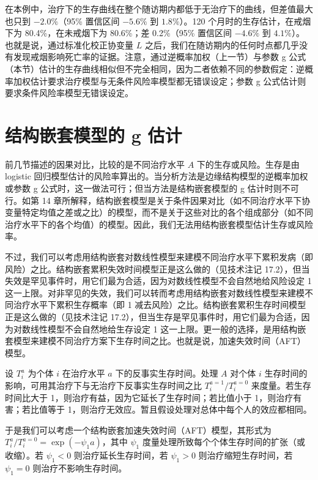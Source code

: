 在本例中，治疗下的生存曲线在整个随访期内都低于无治疗下的曲线，但差值最大也只到 $-2.0\%$（95\% 置信区间 $-5.6\%$ 到 $1.8\%$）。120 个月时的生存估计，在戒烟下为 80.4\%，在未戒烟下为 80.6\%；差 0.2\%（95\% 置信区间 $-4.6\%$ 到 $4.1\%$）。也就是说，通过标准化校正协变量 $L$ 之后，我们在随访期内的任何时点都几乎没有发现戒烟影响死亡率的证据。注意，通过逆概率加权（上一节）与参数 g 公式（本节）估计的生存曲线相似但不完全相同，因为二者依赖不同的参数假定：逆概率加权估计要求治疗模型与无条件风险率模型都无错误设定；参数 g 公式估计则要求条件风险率模型无错误设定。

\section{结构嵌套模型的 g 估计}

前几节描述的因果对比，比较的是不同治疗水平 $A$ 下的生存或风险。生存是由 logistic 回归模型估计的风险率算出的。当分析方法是边缘结构模型的逆概率加权或参数 g 公式时，这一做法可行；但当方法是结构嵌套模型的 g 估计时则不可行。如第 14 章所解释，结构嵌套模型是关于条件因果对比（如不同治疗水平下协变量特定均值之差或之比）的模型，而不是关于这些对比的各个组成部分（如不同治疗水平下的各个均值）的模型。因此，我们无法用结构嵌套模型估计生存或风险率。

不过，我们可以考虑用结构嵌套对数线性模型来建模不同治疗水平下累积发病（即风险）之比。结构嵌套累积失效时间模型正是这么做的（见技术注记 17.2），但当失效是罕见事件时，用它们最为合适，因为对数线性模型不会自然地给风险设定 1 这一上限。对非罕见的失效，我们可以转而考虑用结构嵌套对数线性模型来建模不同治疗水平下累积生存概率（即 1 减去风险）之比。结构嵌套累积生存时间模型正是这么做的（见技术注记 17.2），但当生存是罕见事件时，用它们最为合适，因为对数线性模型不会自然地给生存设定 1 这一上限。更一般的选择，是用结构嵌套模型来建模不同治疗方案下生存时间之比。也就是说，加速失效时间（AFT）模型。

设 $T_i^a$ 为个体 $i$ 在治疗水平 $a$ 下的反事实生存时间。处理 $A$ 对个体 $i$ 生存时间的影响，可用其治疗下与无治疗下反事实生存时间之比 $T_i^{a=1}/T_i^{a=0}$ 来度量。若生存时间比大于 1，则治疗有益，因为它延长了生存时间；若比值小于 1，则治疗有害；若比值等于 1，则治疗无效应。暂且假设处理对总体中每个人的效应都相同。

于是我们可以考虑一个结构嵌套加速失效时间（AFT）模型，其形式为 $T_i^a/T_i^{a=0}=\exp(-\psi_1a)$，其中 $\psi_1$ 度量处理所致每个个体生存时间的扩张（或收缩）。若 $\psi_1<0$ 则治疗延长生存时间，若 $\psi_1>0$ 则治疗缩短生存时间，若 $\psi_1=0$ 则治疗不影响生存时间。

